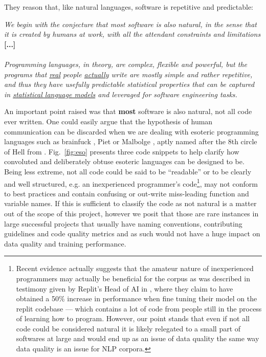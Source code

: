 They reason that, like natural languages, software is repetitive and predictable:

\begin{myquote}
    \textit{We begin with the conjecture that \emph{most software is also natural}, in the sense that it is created by humans at work, with all the attendant constraints and limitations} \textbf{[...]}
    \\
    \\
    \qquad \textit{Programming languages, in theory, are complex, flexible and powerful, but the programs that \underline{real} people \underline{actually} write are mostly simple and rather repetitive, and thus they have usefully predictable statistical properties that can be captured in \underline{statistical language models} and leveraged for software engineering tasks. }\\\citet{naturalidade_original} 
\end{myquote}

An important point raised was that \textbf{most} software is also natural, not all code ever written. One could easily argue that the hypothesis of human communication can be discarded when we are dealing with esoteric programming languages such as brainfuck \citep{brainfuck}, Piet \citep{piet} or Malbolge \citep{malbolge}, aptly named after the 8th circle of Hell from \citet{alighieri1788divina}. Fig.~\ref{fig:eso} presents three code snippets to help clarify how convoluted and deliberately obtuse esoteric languages can be designed to be. 
Being less extreme, not all code could be said to be ``readable'' or to be clearly and well structured, e.g. an inexperienced programmer's code\footnote{Recent evidence actually suggests that the amateur nature of inexperienced programmers may actually be beneficial for the corpus as was described in testimony given by Replit’s Head of AI in \citet{podcast_replit}, where they claim to have obtained a 50\% increase in performance when fine tuning their model on the replit codebase --- which contains a lot of code from people still in the process of learning how to program. However, our point stands that even if not all code could be considered natural it is likely relegated to a small part of softwares at large and would end up as an issue of data quality the same way data quality is an issue for NLP corpora.}, may not conform to best practices and contain confusing or out-write miss-leading function and variable names. If this is sufficient to classify the code as not natural is a matter out of the scope of this project, however we posit that those are rare instances in large successful projects that usually have naming conventions, contributing guidelines and code quality metrics and as such would not have a huge impact on data quality and training performance.

